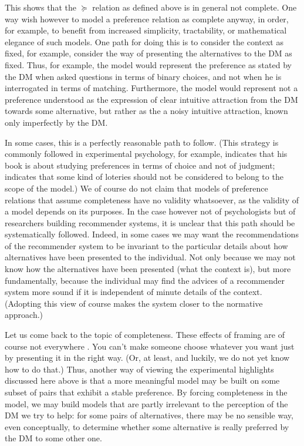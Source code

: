 \documentclass[french, english]{llncs}
\begin{document}
This shows that the $\succeq$ relation as defined above is in general not complete. One way wish however to model a preference relation as complete anyway, in order, for example, to benefit from increased simplicity, tractability, or mathematical elegance of such models. One path for doing this is to consider the context as fixed, for example, consider the way of presenting the alternatives to the \ac{DM} as fixed. Thus, for example, the model would represent the preference as stated by the \ac{DM} when asked questions in terms of binary choices, and not when he is interrogated in terms of matching. Furthermore, the model would represent not a preference understood as the expression of clear intuitive attraction from the \ac{DM} towards some alternative, but rather as the a noisy intuitive attraction, known only imperfectly by the \ac{DM}. 

In some cases, this is a perfectly reasonable path to follow. (This strategy is commonly followed in experimental psychology, for example, \citet{Luce} indicates that his book is about studying preferences in terms of choice and not of judgment; \citet{MacCrimmon} indicates that some kind of loteries should not be considered to belong to the scope of the model.) We of course do not claim that models of preference relations that assume completeness have no validity whatsoever, as the validity of a model depends on its purposes. In the case however not of psychologists but of researchers building recommender systems, it is unclear that this path should be systematically followed. Indeed, in some cases we may want the recommendations of the recommender system to be invariant to the particular details about how alternatives have been presented to the individual. Not only because we may not know how the alternatives have been presented (what the context is), but more fundamentally, because the individual may find the advices of a recommender system more sound if it is independent of minute details of the context. (Adopting this view of course makes the system closer to the normative approach.)

Let us come back to the topic of completeness. These effects of framing are of course not everywhere \citep{slovic}. You can’t make someone choose whatever you want just by presenting it in the right way. (Or, at least, and luckily, we do not yet know how to do that.) Thus, another way of viewing the experimental highlights discussed here above is that a more meaningful model may be built on some subset of pairs that exhibit a stable preference. By forcing completeness in the model, we may build models that are partly irrelevant to the perception of the \ac{DM} we try to help: for some pairs of alternatives, there may be no sensible way, even conceptually, to determine whether some alternative is really preferred by the \ac{DM} to some other one.
\end{document}
